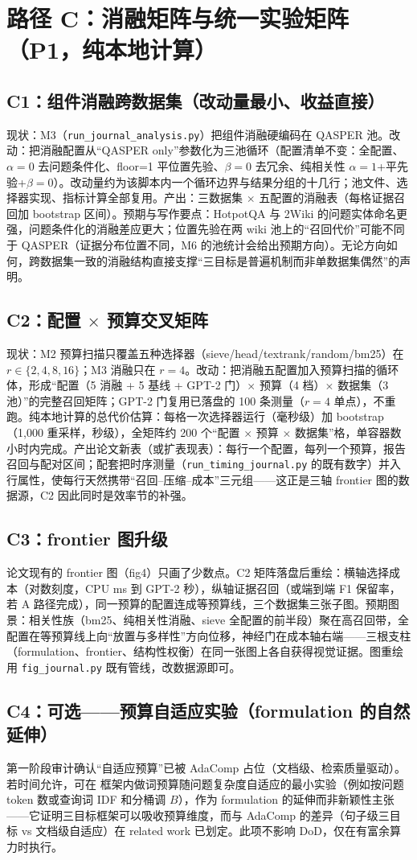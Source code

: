 \section{路径 C：消融矩阵与统一实验矩阵（P1，纯本地计算）}

\subsection{C1：组件消融跨数据集（改动量最小、收益直接）}

现状：M3（\texttt{run\_journal\_analysis.py}）把组件消融硬编码在 QASPER 池。改动：把消融配置从``QASPER only''参数化为三池循环（配置清单不变：全配置、$\alpha{=}0$ 去问题条件化、floor=1 平位置先验、$\beta{=}0$ 去冗余、纯相关性 $\alpha{=}1$+平先验+$\beta{=}0$）。改动量约为该脚本内一个循环边界与结果分组的十几行；池文件、选择器实现、指标计算全部复用。产出：三数据集 $\times$ 五配置的消融表（每格证据召回加 bootstrap 区间）。预期与写作要点：HotpotQA 与 2Wiki 的问题实体命名更强，问题条件化的消融差应更大；位置先验在两 wiki 池上的``召回代价''可能不同于 QASPER（证据分布位置不同，M6 的池统计会给出预期方向）。无论方向如何，跨数据集一致的消融结构直接支撑``三目标是普遍机制而非单数据集偶然''的声明。

\subsection{C2：配置 \texorpdfstring{$\times$}{x} 预算交叉矩阵}

现状：M2 预算扫描只覆盖五种选择器（sieve/head/textrank/random/bm25）在 $r\in\{2,4,8,16\}$；M3 消融只在 $r{=}4$。改动：把消融五配置加入预算扫描的循环体，形成``配置（5 消融 + 5 基线 + GPT-2 门）$\times$ 预算（4 档）$\times$ 数据集（3 池）''的完整召回矩阵；GPT-2 门复用已落盘的 100 条测量（$r{=}4$ 单点），不重跑。纯本地计算的总代价估算：每格一次选择器运行（毫秒级）加 bootstrap（1{,}000 重采样，秒级），全矩阵约 200 个``配置 $\times$ 预算 $\times$ 数据集''格，单容器数小时内完成。产出论文新表（或扩表现表）：每行一个配置，每列一个预算，报告召回与配对区间；配套把时序测量（\texttt{run\_timing\_journal.py} 的既有数字）并入行属性，使每行天然携带``召回--压缩--成本''三元组——这正是三轴 frontier 图的数据源，C2 因此同时是效率节的补强。

\subsection{C3：frontier 图升级}

论文现有的 frontier 图（fig4）只画了少数点。C2 矩阵落盘后重绘：横轴选择成本（对数刻度，CPU ms 到 GPT-2 秒），纵轴证据召回（或端到端 F1 保留率，若 A 路径完成），同一预算的配置连成等预算线，三个数据集三张子图。预期图景：相关性族（bm25、纯相关性消融、sieve 全配置的前半段）聚在高召回带，全配置在等预算线上向``放置与多样性''方向位移，神经门在成本轴右端——三根支柱（formulation、frontier、结构性权衡）在同一张图上各自获得视觉证据。图重绘用 \texttt{fig\_journal.py} 既有管线，改数据源即可。

\subsection{C4：可选——预算自适应实验（formulation 的自然延伸）}

第一阶段审计确认``自适应预算''已被 AdaComp 占位（文档级、检索质量驱动）。若时间允许，可在 \sieve{} 框架内做词预算随问题复杂度自适应的最小实验（例如按问题 token 数或查询词 IDF 和分桶调 $B$），作为 formulation 的延伸而非新颖性主张——它证明三目标框架可以吸收预算维度，而与 AdaComp 的差异（句子级三目标 vs 文档级自适应）在 related work 已划定。此项不影响 DoD，仅在有富余算力时执行。

